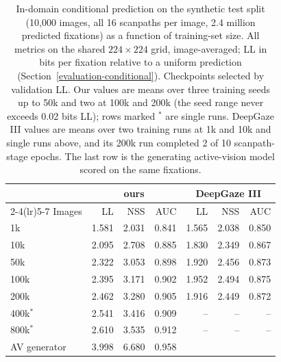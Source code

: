
\begin{table}[t]
  \centering
  \small
  \begin{tabular}{lrrrrrr}
    \toprule
    & \multicolumn{3}{c}{ours} & \multicolumn{3}{c}{DeepGaze III} \\
    \cmidrule(lr){2-4}\cmidrule(lr){5-7}
    Images & LL & NSS & AUC & LL & NSS & AUC \\
    \midrule
    1k & 1.581 & 2.031 & 0.841 & 1.565 & 2.038 & 0.850 \\
    10k & 2.095 & 2.708 & 0.885 & 1.830 & 2.349 & 0.867 \\
    50k & 2.322 & 3.053 & 0.898 & 1.920 & 2.456 & 0.873 \\
    100k & 2.395 & 3.171 & 0.902 & 1.952 & 2.494 & 0.875 \\
    200k & 2.462 & 3.280 & 0.905 & 1.916 & 2.449 & 0.872 \\[1pt]
    400k$^{*}$ & 2.541 & 3.416 & 0.909 & -- & -- & -- \\
    800k$^{*}$ & 2.610 & 3.535 & 0.912 & -- & -- & -- \\
    \midrule
    AV generator & 3.998 & 6.680 & 0.958 & \multicolumn{3}{c}{} \\
    \bottomrule
  \end{tabular}
  \caption{In-domain conditional prediction on the synthetic test split (10,000 images, all 16 scanpaths per image, 2.4 million predicted fixations) as a function of training-set size. All metrics on the shared $224\times224$ grid, image-averaged; LL in bits per fixation relative to a uniform prediction (Section~\ref{evaluation-conditional}). Checkpoints selected by validation LL. Our values are means over three training seeds up to 50k and two at 100k and 200k (the seed range never exceeds 0.02 bits LL); rows marked $^{*}$ are single runs. DeepGaze III values are means over two training runs at 1k and 10k and single runs above, and its 200k run completed 2 of 10 scanpath-stage epochs. The last row is the generating active-vision model scored on the same fixations.}
  \label{tab:indomain}
\end{table}

